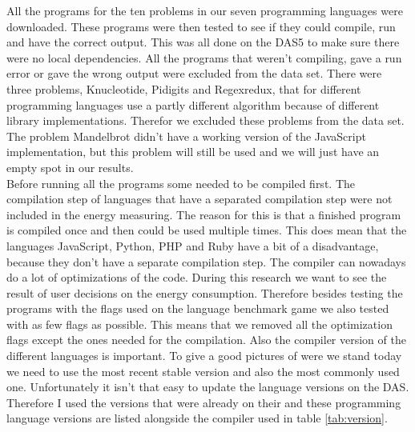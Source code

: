 All the programs for the ten problems in our seven programming languages were downloaded. These programs were then tested to see if they could compile, run and have the correct output. This was all done on the DAS5 to make sure there were no local dependencies. All the programs that weren't compiling, gave a run error or gave the wrong output were excluded from the data set. There were three problems, Knucleotide, Pidigits and Regexredux, that for different programming languages use a partly different algorithm because of different library implementations. Therefor we excluded these problems from the data set. The problem Mandelbrot didn't have a working version of the JavaScript implementation, but this problem will still be used and we will just have an empty spot in our results.\\


Before running all the programs some needed to be compiled first. The compilation step of languages that have a separated compilation step were not included in the energy measuring. The reason for this is that a finished program is compiled once and then could be used multiple times. This does mean that the languages JavaScript, Python, PHP and Ruby have a bit of a disadvantage, because they don't have a separate compilation step. The compiler can nowadays do a lot of optimizations of the code. During this research we want to see the result of user decisions on the energy consumption. Therefore besides testing the programs with the flags used on the language benchmark game we also tested with as few flags as possible. This means that we removed all the optimization flags except the ones needed for the compilation. Also the compiler version of the different languages is important. To give a good pictures of were we stand today we need to use the most recent stable version and also the most commonly used one. Unfortunately it isn't that easy to update the language versions on the DAS. Therefore I used the versions that were already on their and these programming language versions are listed alongside the compiler used in table \ref{tab:version}.

